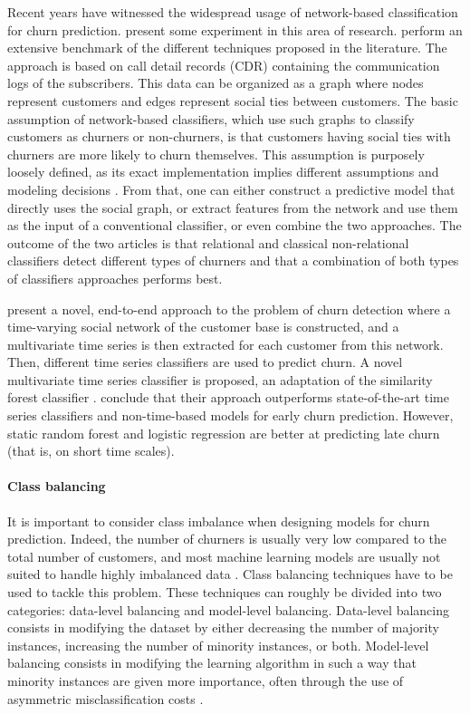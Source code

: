 Recent years have witnessed the widespread usage of network-based classification
for churn prediction. \textcite{verbeke2014social} present some experiment in
this area of research. \parencite{oskarsdottir2017social} perform an extensive
benchmark of the different techniques proposed in the literature. The approach
is based on call detail records (CDR) containing the communication logs of the
subscribers. This data can be organized as a graph where nodes represent
customers and edges represent social ties between customers. The basic
assumption of network-based classifiers, which use such graphs to classify
customers as churners or non-churners, is that customers having social ties with
churners are more likely to churn themselves. This assumption is purposely
loosely defined, as its exact implementation implies different assumptions and
modeling decisions \parencite{oskarsdottir2017social}. From that, one can either
construct a predictive model that directly uses the social graph, or extract
features from the network and use them as the input of a conventional
classifier, or even combine the two approaches. The outcome of the two articles
is that relational and classical non-relational classifiers detect different
types of churners and that a combination of both types of classifiers
approaches performs best.

\textcite{oskarsdottir2018time} present a novel, end-to-end approach to the
problem of churn detection where a time-varying social network of the customer
base is constructed, and a multivariate time series is then extracted for each
customer from this network. Then, different time series classifiers are used to
predict churn. A novel multivariate time series classifier is proposed, an
adaptation of the similarity forest classifier \parencite{sathe2017similarity}.
\textcite{oskarsdottir2018time} conclude that their approach outperforms
state-of-the-art time series classifiers and non-time-based models for early
churn prediction. However, static random forest and logistic regression are
better at predicting late churn (that is, on short time scales).

\paragraph{Class balancing} It is important to consider class imbalance when
designing models for churn prediction. Indeed, the number of churners is usually
very low compared to the total number of customers, and most machine learning
models are usually not suited to handle highly imbalanced data
\parencite{batista2004study}. Class balancing techniques have to be used to
tackle this problem. These techniques can roughly be divided into two
categories: data-level balancing and model-level balancing. Data-level balancing
consists in modifying the dataset by either decreasing the number of majority
instances, increasing the number of minority instances, or both. Model-level
balancing consists in modifying the learning algorithm in such a way that
minority instances are given more importance, often through the use of
asymmetric misclassification costs \parencite{zhu2017empirical}.

